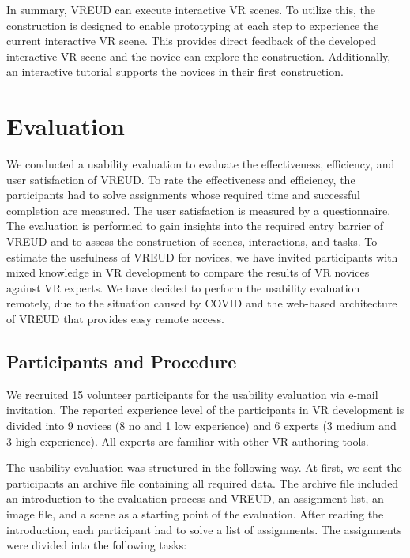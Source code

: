 \documentclass[conference]{IEEEtran}
\begin{document}
In summary, VREUD can execute interactive VR scenes. To utilize this, the construction is designed to enable prototyping at each step to experience the current interactive \ac{VR} scene. This provides direct feedback of the developed interactive VR scene and the novice can explore the construction. Additionally, an interactive tutorial supports the novices in their first construction.

\section{Evaluation}
We conducted a usability evaluation to evaluate the effectiveness, efficiency, and user satisfaction of VREUD. To rate the effectiveness and efficiency, the participants had to solve assignments whose required time and successful completion are measured. The user satisfaction is measured by a questionnaire. The evaluation is performed to gain insights into the required entry barrier of VREUD and to assess the construction of scenes, interactions, and tasks. To estimate the usefulness of VREUD for novices, we have invited participants with mixed knowledge in \ac{VR} development to compare the results of \ac{VR} novices against \ac{VR} experts. We have decided to perform the usability evaluation remotely, due to the situation caused by COVID and the web-based architecture of VREUD that provides easy remote access.

\subsection{Participants and Procedure}
We recruited 15 volunteer participants for the usability evaluation via e-mail invitation. The reported experience level of the participants in \ac{VR} development is divided into 9 novices (8 no and 1 low experience) and 6 experts (3 medium and 3 high experience). All experts are familiar with other \ac{VR} authoring tools.

The usability evaluation was structured in the following way. At first, we sent the participants an archive file containing all required data. The archive file included an introduction to the evaluation process and VREUD, an assignment list, an image file, and a scene as a starting point of the evaluation. After reading the introduction, each participant had to solve a list of assignments. The assignments were divided into the following tasks:
\end{document}

